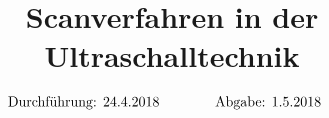 

\subject{US2}
\title{Scanverfahren in der Ultraschalltechnik}

\date{
  \begin{align}
    \text{Durchführung: } & \text{24.4.2018} & \hspace{3em} & \text{Abgabe: 1.5.2018} \notag
  \end{align}
}




\maketitle
\thispagestyle{empty}
\tableofcontents
\newpage






\nocite{*}
\printbibliography{}


